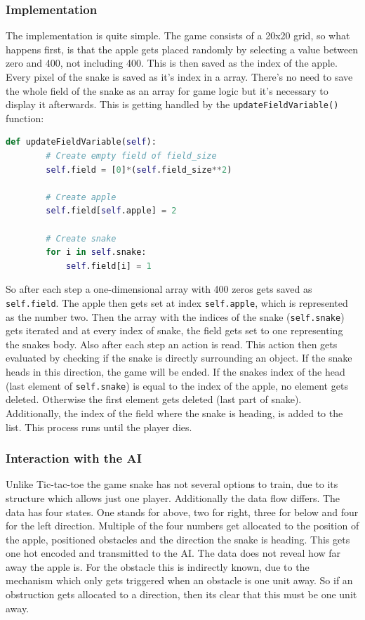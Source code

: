 \documentclass[12pt]{article}
\begin{document}
\subsubsection{Implementation}
The implementation is quite simple. The game consists of a 20x20 grid, so what happens first, is that the apple gets placed randomly by selecting a value between zero and 400, not including 400. This is then saved as the index of the apple. Every pixel of the snake is saved as it's index in a array. There's no need to save the whole field of the snake as an array for game logic but it's necessary to display it afterwards. This is getting handled by the \lstinline{updateFieldVariable()} function:
\begin{lstlisting}[language=Python, caption=Example - Create a snake field every second of size \lstinline{self.field_size}]
    def updateFieldVariable(self):
        # Create empty field of field_size
        self.field = [0]*(self.field_size**2)

        # Create apple
        self.field[self.apple] = 2
        
        # Create snake
        for i in self.snake:
            self.field[i] = 1
\end{lstlisting}
So after each step a one-dimensional array with 400 zeros gets saved as \lstinline{self.field}. The apple then gets set at index \lstinline{self.apple}, which is represented as the number two. Then the array with the indices of the snake (\lstinline{self.snake}) gets iterated and at every index of snake, the field gets set to one representing the snakes body. Also after each step an action is read. This action then gets evaluated by checking if the snake is directly surrounding an object. If the snake heads in this direction, the game will be ended. If the snakes index of the head (last element of \lstinline{self.snake}) is equal to the index of the apple, no element gets deleted. Otherwise the first element gets deleted (last part of snake). Additionally, the index of the field where the snake is heading, is added to the list. This process runs until the player dies.
\subsubsection{Interaction with the AI}
Unlike Tic-tac-toe the game snake has not several options to train, due to its structure which allows just one player. Additionally the data flow differs. The data has four states. One stands for above, two for right, three for below and four for the left direction. Multiple of the four numbers get allocated to the position of the apple, positioned obstacles and the direction the snake is heading. This gets one hot encoded and transmitted to the AI. The data does not reveal how far away the apple is. For the obstacle this is indirectly known, due to the mechanism which only gets triggered when an obstacle is one unit away. So if an obstruction gets allocated to a direction, then its clear that this must be one unit away. 
\end{document}
